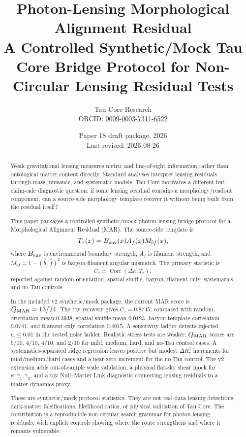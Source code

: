 \documentclass[12pt]{article}
\title{\textbf{Photon-Lensing Morphological Alignment Residual}\\
\large A Controlled Synthetic/Mock Tau Core Bridge Protocol for Non-Circular Lensing Residual Tests}
\author{Tau Core Research\\{\small ORCID: \href{https://orcid.org/0009-0003-7311-6522}{0009-0003-7311-6522}}}
\date{Paper 18 draft package, 2026\\Last revised: 2026-08-26}
\begin{document}
\maketitle

\begin{abstract}
Weak gravitational lensing measures metric and line-of-sight information rather
than ontological matter content directly.  Standard analyses interpret lensing
residuals through mass, nuisance, and systematic models.  Tau Core motivates a
different but claim-safe diagnostic question: if some lensing residual contains
a morphology/readout component, can a source-side morphology template recover
it without being built from the residual itself?

This paper packages a controlled synthetic/mock photon-lensing bridge protocol for a
Morphological Alignment Residual (MAR).  The source-side template is
\[
  T_{\tau}(x)=B_{\rm env}(x)A_f(x)M_{bf}(x),
\]
where \(B_{\rm env}\) is environmental boundary strength, \(A_f\) is filament
strength, and \(M_{bf}=1-(\hat b\cdot\hat f)^2\) is baryon-filament angular
mismatch.  The primary statistic is
\[
  C_{\tau}=\operatorname{Corr}(\Delta\kappa,T_{\tau}),
\]
reported against random-orientation, spatial-shuffle, baryon, filament-only,
systematics, and no-Tau controls.

In the included v2 synthetic/mock package, the current MAR score is
\(Q_{\rm MAR}=13/24\).  The toy recovery gives
\(C_{\tau}=0.8745\), compared with random-orientation mean \(0.3938\),
spatial-shuffle mean \(0.0123\), baryon-template correlation \(0.0741\), and
filament-only correlation \(0.4015\).  A sensitivity ladder detects injected
\(\epsilon_{\tau}\leq0.01\) in the tested noise ladder.  Realistic stress tests
are weaker: \(Q_{\rm MAR}\) scores are \(5/10\), \(4/10\), \(4/10\), and
\(2/10\) for mild, medium, hard, and no-Tau control cases.  A
systematics-separated ridge regression leaves positive but modest
\(\Delta R^2_{\tau}\) increments for mild/medium/hard cases and a near-zero
increment for the no-Tau control.  The v2 extension adds out-of-sample scale
validation, a physical flat-sky shear mock for \(\kappa,\gamma_1,\gamma_2\),
and a toy Null--Matter Link diagnostic connecting lensing residuals to a
matter-dynamics proxy.

These are synthetic/mock protocol statistics.  They are not real-data lensing
detections, dark-matter falsifications, likelihood ratios, or physical
validation of Tau Core.  The contribution is a reproducible non-circular
search grammar for photon-lensing residuals, with explicit controls showing
where the route strengthens and where it remains vulnerable.
\end{abstract}
\end{document}
